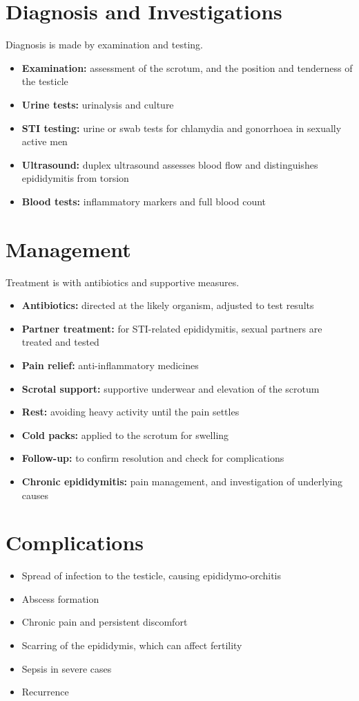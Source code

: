 \section*{Diagnosis and Investigations}
Diagnosis is made by examination and testing.
\begin{itemize}
    \item \textbf{Examination:} assessment of the scrotum, and the position and tenderness of the testicle
    \item \textbf{Urine tests:} urinalysis and culture
    \item \textbf{STI testing:} urine or swab tests for chlamydia and gonorrhoea in sexually active men
    \item \textbf{Ultrasound:} duplex ultrasound assesses blood flow and distinguishes epididymitis from torsion
    \item \textbf{Blood tests:} inflammatory markers and full blood count
\end{itemize}

\section*{Management}
Treatment is with antibiotics and supportive measures.
\begin{itemize}
    \item \textbf{Antibiotics:} directed at the likely organism, adjusted to test results
    \item \textbf{Partner treatment:} for STI-related epididymitis, sexual partners are treated and tested
    \item \textbf{Pain relief:} anti-inflammatory medicines
    \item \textbf{Scrotal support:} supportive underwear and elevation of the scrotum
    \item \textbf{Rest:} avoiding heavy activity until the pain settles
    \item \textbf{Cold packs:} applied to the scrotum for swelling
    \item \textbf{Follow-up:} to confirm resolution and check for complications
    \item \textbf{Chronic epididymitis:} pain management, and investigation of underlying causes
\end{itemize}

\section*{Complications}
\begin{itemize}
    \item Spread of infection to the testicle, causing epididymo-orchitis
    \item Abscess formation
    \item Chronic pain and persistent discomfort
    \item Scarring of the epididymis, which can affect fertility
    \item Sepsis in severe cases
    \item Recurrence
\end{itemize}

